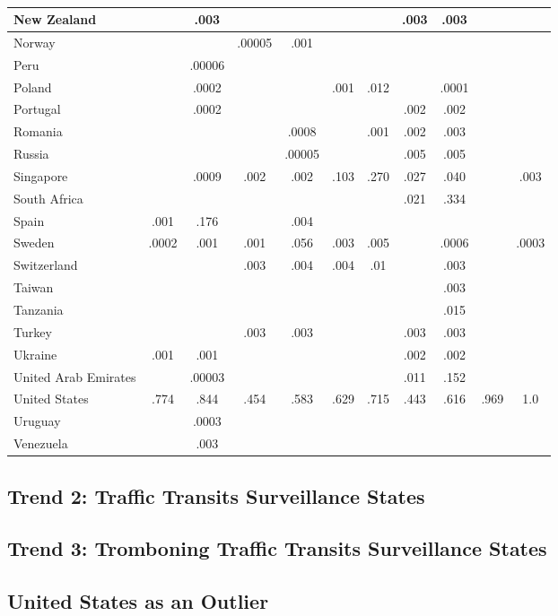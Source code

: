 \begin{table*}[h!]
\begin{tabular}{|P{37mm}|cc|cc|cc|cc|cc|}
New Zealand             &    &.003   &     &  &    &   &.003   &.003     &  & \\\hline
Norway             &    &   &.00005     &.001  &    &   &   &     &  & \\\hline
Peru             &     &.00006   &     &  &   &   &   &     &  & \\\hline
Poland             &    &.0002   &     &  &.001    &.012   &   &.0001     &  & \\\hline
Portugal             &    &.0002   &     &  &   &   &.002    &.002     &  & \\\hline
Romania             &     &   &     &.0008  &   &.001   &.002    &.003     &  & \\\hline
Russia             &    &  &     &.00005  &   &   &.005   &.005     &  & \\\hline
Singapore             &    &.0009   &.002     &.002  &.103    &.270   &.027    &.040     &  &.003 \\\hline
South Africa             &    &   &     &  &   &   &.021    &.334     &  & \\\hline
Spain             &.001     &.176   &    &.004  &   &   &   &     &  & \\\hline
Sweden             &.0002     &.001   &.001     &.056  &.003    &.005   &   &.0006     &  &.0003 \\\hline
Switzerland             &     &   &.003     &.004  &.004   &.01   &   &.003     &  & \\\hline
Taiwan             &     &   &     &  &   &  &    &.003     &  & \\\hline
Tanzania             &    &   &     &  &   &   &   &.015     &  & \\\hline
Turkey             &     &   &.003     &.003  &   &   &.003    &.003     &  & \\\hline
Ukraine             &.001     &.001   &     &  &    &   &.002    &.002     &  & \\\hline
United Arab Emirates             &     &.00003   &     &  &   &   &.011    &.152     &  & \\\hline
United States             &.774     &.844   &.454     &.583  &.629    &.715   &.443    &.616     &.969  &1.0 \\\hline
Uruguay             &     &.0003   &    &  &    &   &   &     &  & \\\hline
Venezuela             &    &.003   &     &  &   &   &   &     &  & \\\hline
\end{tabular}
\caption*{}
\label{tab:class}
\end{table*}

\subsection{Trend 2: Traffic Transits Surveillance States}

\subsection{Trend 3: Tromboning Traffic Transits Surveillance States}

\subsection{United States as an Outlier}

